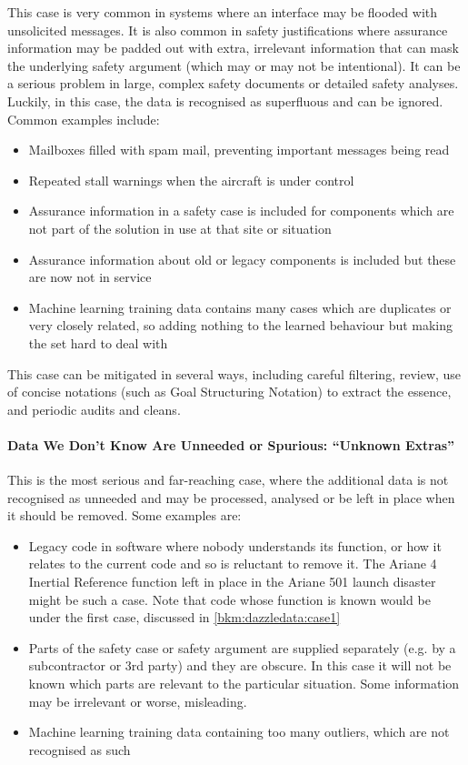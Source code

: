 This case is very common in systems where an interface may be flooded with unsolicited messages.
It is also common in  safety justifications where assurance information may be padded out with extra, irrelevant information that can mask the underlying safety argument (which may or may not be intentional).
It can be a serious problem in large, complex safety documents or detailed safety analyses.
Luckily, in this case, the data is recognised as superfluous and can be ignored.
Common examples include:
\begin{itemize}
    \item Mailboxes filled with spam mail, preventing important messages being read
    \item Repeated stall warnings when the aircraft is under control
    \item Assurance information in a safety case is included for components which are not part of the solution in use at that site or situation
    \item Assurance information about old or legacy components is included but these are now not in service
    \item Machine learning training data contains many cases which are duplicates or very closely related, so adding nothing to the learned behaviour but making the set hard to deal with
\end{itemize}
This case can be mitigated in several ways, including careful filtering, review, use of concise  notations (such as Goal Structuring Notation) to extract the essence, and periodic audits and cleans. 

\paragraph{Data We Don’t Know Are Unneeded or Spurious: ``Unknown Extras''}
This is the most serious and far-reaching case, where the additional data is not recognised as unneeded and may be processed, analysed or be left in place when it should be removed. Some examples are:
\begin{itemize}
\item Legacy code in software where nobody understands its function, or how it relates to the current code and so is reluctant to remove it. The Ariane 4 Inertial Reference function left in place in the Ariane 501 launch disaster might be such a case. Note that code whose function is known would be under the first case, discussed in \ref{bkm:dazzledata:case1}
    \item Parts of the safety case or safety argument are supplied separately (e.g. by a subcontractor or 3rd party) and they are obscure. In this case it will not be known which parts are relevant to the particular situation. Some information may be irrelevant or worse, misleading.
    \item Machine learning training data containing too many outliers, which are not recognised as such
\end{itemize}

